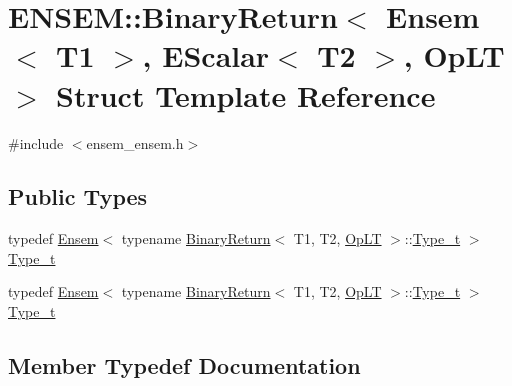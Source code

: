 \hypertarget{structENSEM_1_1BinaryReturn_3_01Ensem_3_01T1_01_4_00_01EScalar_3_01T2_01_4_00_01OpLT_01_4}{}\section{E\+N\+S\+EM\+:\+:Binary\+Return$<$ Ensem$<$ T1 $>$, E\+Scalar$<$ T2 $>$, Op\+LT $>$ Struct Template Reference}
\label{structENSEM_1_1BinaryReturn_3_01Ensem_3_01T1_01_4_00_01EScalar_3_01T2_01_4_00_01OpLT_01_4}


{\ttfamily \#include $<$ensem\+\_\+ensem.\+h$>$}

\subsection*{Public Types}
\begin{DoxyCompactItemize}
\item 
typedef \mbox{\hyperlink{classENSEM_1_1Ensem}{Ensem}}$<$ typename \mbox{\hyperlink{structENSEM_1_1BinaryReturn}{Binary\+Return}}$<$ T1, T2, \mbox{\hyperlink{structENSEM_1_1OpLT}{Op\+LT}} $>$\+::\mbox{\hyperlink{structENSEM_1_1BinaryReturn_3_01Ensem_3_01T1_01_4_00_01EScalar_3_01T2_01_4_00_01OpLT_01_4_ad23674c1df355288c2faa6a3c936b832}{Type\+\_\+t}} $>$ \mbox{\hyperlink{structENSEM_1_1BinaryReturn_3_01Ensem_3_01T1_01_4_00_01EScalar_3_01T2_01_4_00_01OpLT_01_4_ad23674c1df355288c2faa6a3c936b832}{Type\+\_\+t}}
\item 
typedef \mbox{\hyperlink{classENSEM_1_1Ensem}{Ensem}}$<$ typename \mbox{\hyperlink{structENSEM_1_1BinaryReturn}{Binary\+Return}}$<$ T1, T2, \mbox{\hyperlink{structENSEM_1_1OpLT}{Op\+LT}} $>$\+::\mbox{\hyperlink{structENSEM_1_1BinaryReturn_3_01Ensem_3_01T1_01_4_00_01EScalar_3_01T2_01_4_00_01OpLT_01_4_ad23674c1df355288c2faa6a3c936b832}{Type\+\_\+t}} $>$ \mbox{\hyperlink{structENSEM_1_1BinaryReturn_3_01Ensem_3_01T1_01_4_00_01EScalar_3_01T2_01_4_00_01OpLT_01_4_ad23674c1df355288c2faa6a3c936b832}{Type\+\_\+t}}
\end{DoxyCompactItemize}


\subsection{Member Typedef Documentation}
\mbox{\label{structENSEM_1_1BinaryReturn_3_01Ensem_3_01T1_01_4_00_01EScalar_3_01T2_01_4_00_01OpLT_01_4_ad23674c1df355288c2faa6a3c936b832}} 
